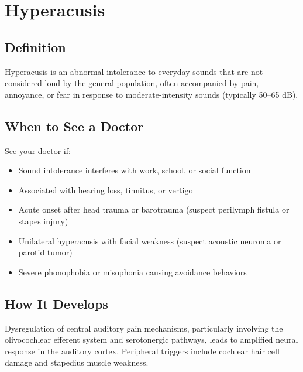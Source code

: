 \chapter{Hyperacusis}

\section*{Definition}
Hyperacusis is an abnormal intolerance to everyday sounds that are not considered loud by the general population, often accompanied by pain, annoyance, or fear in response to moderate-intensity sounds (typically 50--65 dB).

\section*{When to See a Doctor}
See your doctor if:
\begin{itemize}
  \item Sound intolerance interferes with work, school, or social function
  \item Associated with hearing loss, tinnitus, or vertigo
  \item Acute onset after head trauma or barotrauma (suspect perilymph fistula or stapes injury)
  \item Unilateral hyperacusis with facial weakness (suspect acoustic neuroma or parotid tumor)
  \item Severe phonophobia or misophonia causing avoidance behaviors
\end{itemize}

\section*{How It Develops}
Dysregulation of central auditory gain mechanisms, particularly involving the olivocochlear efferent system and serotonergic pathways, leads to amplified neural response in the auditory cortex. Peripheral triggers include cochlear hair cell damage and stapedius muscle weakness.

